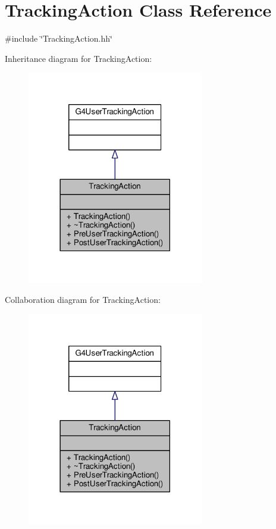 \hypertarget{classTrackingAction}{}\section{Tracking\+Action Class Reference}
\label{classTrackingAction}


{\ttfamily \#include \char`\"{}Tracking\+Action.\+hh\char`\"{}}



Inheritance diagram for Tracking\+Action\+:
\nopagebreak
\begin{figure}[H]
\begin{center}
\leavevmode
\includegraphics[width=218pt]{classTrackingAction__inherit__graph}
\end{center}
\end{figure}


Collaboration diagram for Tracking\+Action\+:
\nopagebreak
\begin{figure}[H]
\begin{center}
\leavevmode
\includegraphics[width=218pt]{classTrackingAction__coll__graph}
\end{center}
\end{figure}
